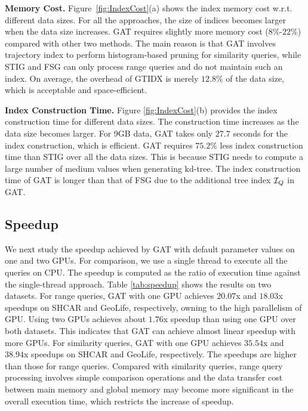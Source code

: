 \documentclass[10pt,conference,letterpaper]{IEEEtran}
\newcommand{\frname}{GAT\xspace }
\newcommand{\idxname}{GTIDX\xspace }
\newcommand{\treeindex}{{{\cal I}_Q}\xspace}
\begin{document}
\vspace{0.1cm}\textbf{Memory Cost.}
Figure~\ref{fig:IndexCost}(a) shows the index memory cost w.r.t. different data sizes.
For all the approaches, the size of indices becomes larger when the data size increases.
\frname requires slightly more memory cost ($8$\%-$22$\%) compared with other two methods.
The main reason is that \frname involves trajectory index to perform histogram-based pruning for similarity queries, while STIG and FSG can only process range queries and do not maintain such an index.
On average, the overhead of \idxname is merely $12.8$\% of the data size, which is acceptable and space-efficient.

\vspace{0.1cm}\textbf{Index Construction Time.}
Figure \ref{fig:IndexCost}(b) provides the index construction time for different data sizes.
The construction time increases as the data size becomes larger. For 9GB data, \frname takes only $27.7$ seconds for the index construction, which is efficient.
\frname requires $75.2$\% less index construction time than STIG over all the data sizes. This is because STIG needs to compute a large number of medium values when generating kd-tree.
The index construction time of \frname is longer than that of FSG due to the additional tree index $\treeindex$ in \frname.


\subsection{Speedup}

We next study the speedup achieved by \frname with default parameter values on one and two GPUs. For comparison, we use a single thread to execute all the queries on CPU. The speedup is computed as the ratio of execution time against the single-thread approach.
Table \ref{tab:speedup} shows the results on two datasets.
%
For range queries, \frname with one GPU achieves $20.07$x and $18.03$x speedups on SHCAR and GeoLife, respectively, owning to the high parallelism of GPU. Using two GPUs achieves about $1.76$x speedup than using one GPU over both datasets. This indicates that \frname can achieve almost linear speedup with more GPUs.
%
For similarity queries, \frname with one GPU achieves $35.54$x and $38.94$x speedups on SHCAR and GeoLife, respectively. The speedups are higher than those for range queries. Compared with similarity queries, range query processing involves simple comparison operations and the data transfer cost between main memory and global memory may become more significant in the overall execution time, which restricts the increase of speedup.
\end{document}
